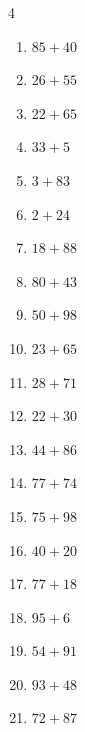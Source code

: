 \begin{multicols}{4}
\begin{enumerate}
  \item $85+40$
        \phantom{$=125$}

  \item $26+55$
        \phantom{$=81$}

  \item $22+65$
        \phantom{$=87$}

  \item $33+5$
        \phantom{$=38$}

  \item $3+83$
        \phantom{$=86$}

  \item $2+24$
        \phantom{$=26$}

  \item $18+88$
        \phantom{$=106$}

  \item $80+43$
        \phantom{$=123$}

  \item $50+98$
        \phantom{$=148$}

  \item $23+65$
        \phantom{$=88$}

  \item $28+71$
        \phantom{$=99$}

  \item $22+30$
        \phantom{$=52$}

  \item $44+86$
        \phantom{$=130$}

  \item $77+74$
        \phantom{$=151$}

  \item $75+98$
        \phantom{$=173$}

  \item $40+20$
        \phantom{$=60$}

  \item $77+18$
        \phantom{$=95$}

  \item $95+6$
        \phantom{$=101$}

  \item $54+91$
        \phantom{$=145$}

  \item $93+48$
        \phantom{$=141$}

\columnbreak %

  \item $72+87$
        \phantom{$=159$}


\end{enumerate}
\end{multicols}
